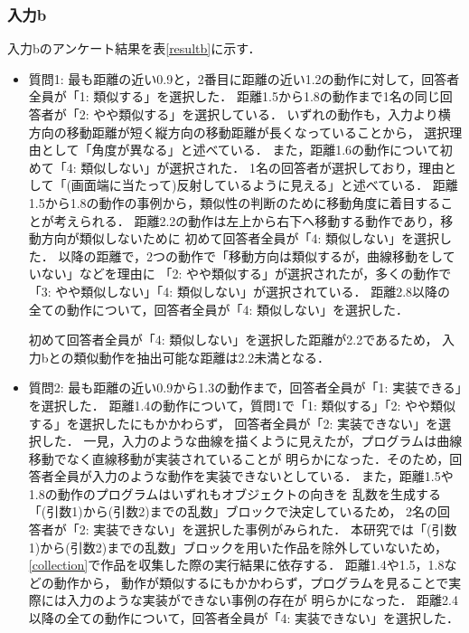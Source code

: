 \documentclass[11pt]{jreport}
\begin{document}
\subsubsection{入力b}
入力bのアンケート結果を表\ref{resultb}に示す．

\begin{itemize}
    \item 質問1: 最も距離の近い0.9と，2番目に距離の近い1.2の動作に対して，回答者全員が「1: 類似する」を選択した．
    距離1.5から1.8の動作まで1名の同じ回答者が「2: やや類似する」を選択している．
    いずれの動作も，入力より横方向の移動距離が短く縦方向の移動距離が長くなっていることから，
    選択理由として「角度が異なる」と述べている．
    また，距離1.6の動作について初めて「4: 類似しない」が選択された．
    1名の回答者が選択しており，理由として「(画面端に当たって)反射しているように見える」と述べている．
    距離1.5から1.8の動作の事例から，類似性の判断のために移動角度に着目することが考えられる．
    距離2.2の動作は左上から右下へ移動する動作であり，移動方向が類似しないために
    初めて回答者全員が「4: 類似しない」を選択した．
    以降の距離で，2つの動作で「移動方向は類似するが，曲線移動をしていない」などを理由に
    「2: やや類似する」が選択されたが，多くの動作で「3: やや類似しない」「4: 類似しない」が選択されている．
    距離2.8以降の全ての動作について，回答者全員が「4: 類似しない」を選択した．
    
    初めて回答者全員が「4: 類似しない」を選択した距離が2.2であるため，
    入力bとの類似動作を抽出可能な距離は2.2未満となる．
    
    \item 質問2: 最も距離の近い0.9から1.3の動作まで，回答者全員が「1: 実装できる」を選択した．
    距離1.4の動作について，質問1で「1: 類似する」「2: やや類似する」を選択したにもかかわらず，
    回答者全員が「2: 実装できない」を選択した．
    一見，入力のような曲線を描くように見えたが，プログラムは曲線移動でなく直線移動が実装されていることが
    明らかになった．そのため，回答者全員が入力のような動作を実装できないとしている．
    また，距離1.5や1.8の動作のプログラムはいずれもオブジェクトの向きを
    乱数を生成する「(引数1)から(引数2)までの乱数」ブロックで決定しているため，
    2名の回答者が「2: 実装できない」を選択した事例がみられた．
    本研究では「(引数1)から(引数2)までの乱数」ブロックを用いた作品を除外していないため，
    \ref{collection}で作品を収集した際の実行結果に依存する．
    距離1.4や1.5，1.8などの動作から，
    動作が類似するにもかかわらず，プログラムを見ることで実際には入力のような実装ができない事例の存在が
    明らかになった．
    距離2.4以降の全ての動作について，回答者全員が「4: 実装できない」を選択した．
\end{itemize}    
    
\end{document}
